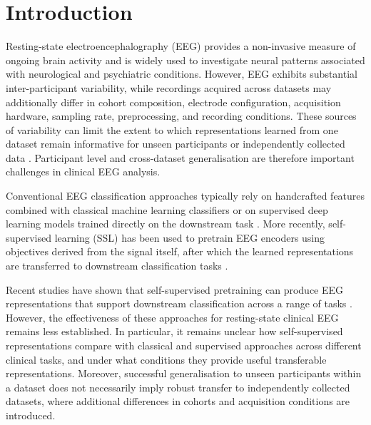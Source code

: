 
\chapter{Introduction}\label{ch:introduction}

Resting-state electroencephalography (EEG) provides a non-invasive measure of ongoing brain activity and is widely used to investigate neural patterns associated with neurological and psychiatric conditions. However, EEG exhibits substantial inter-participant variability, while recordings acquired across datasets may additionally differ in cohort composition, electrode configuration, acquisition hardware, sampling rate, preprocessing, and recording conditions. These sources of variability can limit the extent to which representations learned from one dataset remain informative for unseen participants or independently collected data \parencite{kimDeepLearningBasedEEG2023,engemannReusableBenchmarkBrainAge2021,waghEvaluatingLatentSpaceRobustness2022}. Participant level and cross-dataset generalisation are therefore important challenges in clinical EEG analysis.

Conventional EEG classification approaches typically rely on handcrafted features combined with classical machine learning classifiers or on supervised deep learning models trained directly on the downstream task \parencite{craikDeepLearningElectroencephalogram2019,gemeinMachineLearningBasedDiagnostics2020}. More recently, self-supervised learning (SSL) has been used to pretrain EEG encoders using objectives derived from the signal itself, after which the learned representations are transferred to downstream classification tasks \parencite{banvilleUncoveringStructureClinical2020,kostasBENDRUsingTransformers2021}.

Recent studies have shown that self-supervised pretraining can produce EEG representations that support downstream classification across a range of tasks \parencite{jiangLARGEBRAINMODEL2024,wangCBraModCrissCrossBrain2025a,el2026reve}. However, the effectiveness of these approaches for resting-state clinical EEG remains less established. In particular, it remains unclear how self-supervised representations compare with classical and supervised approaches across different clinical tasks, and under what conditions they provide useful transferable representations. Moreover, successful generalisation to unseen participants within a dataset does not necessarily imply robust transfer to independently collected datasets, where additional differences in cohorts and acquisition conditions are introduced.

